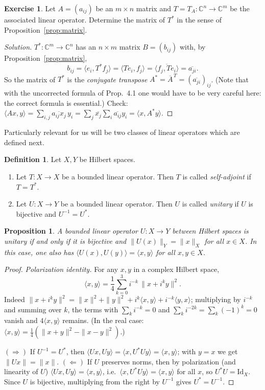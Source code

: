 \documentclass[11pt,a4paper]{article}
\numberwithin{equation}{section}
\newcommand{\C}{\mathbb{C}}
\newcommand{\ip}[2]{\langle #1, #2\rangle}
\newcommand{\conj}[1]{\overline{#1}}
\theoremstyle{plain}
\newtheorem{proposition}[theorem]{Proposition}
\theoremstyle{definition}
\newtheorem{definition}[theorem]{Definition}
\newtheorem{exercise}[theorem]{Exercise}
\theoremstyle{plain}
\theoremstyle{definition}
\newenvironment{solution}{\begin{proof}[Solution]}{\end{proof}}
\begin{document}
\begin{exercise}\label{exo:adjmatrix}
Let $A=(a_{ij})$ be an $m\times n$ matrix and $T=T_A:\C^n\to\C^m$ be the associated linear
operator. Determine the matrix of $T^*$ in the sense of Proposition~\ref{prop:matrix}.
\end{exercise}
\begin{solution}
$T^*:\C^m\to\C^n$ has an $n\times m$ matrix $B=(b_{ij})$ with, by Proposition~\ref{prop:matrix},
\[
b_{ij}=\ip{e_i}{T^*f_j}=\ip{Te_i}{f_j}=\conj{\ip{f_j}{Te_i}}=\conj{a_{ji}} .
\]
So the matrix of $T^*$ is the \emph{conjugate transpose} $A^*=\conj{A}^{\,T}=(\conj{a_{ji}})_{ij}$.
(Note that with the uncorrected formula of Prop.~4.1 one would have to be very careful
here: the correct formula is essential.) Check: $\ip{Ax}{y}=\sum_{i,j}\conj{a_{ij}x_j}\,y_i
=\sum_j\conj{x_j}\sum_i\conj{a_{ij}}y_i=\ip{x}{A^*y}$.
\end{solution}

Particularly relevant for us will be two classes of linear operators which are defined next.

\begin{definition}
Let $X,Y$ be Hilbert spaces.
\begin{enumerate}
\item Let $T:X\to X$ be a bounded linear operator. Then $T$ is called \emph{self-adjoint} if $T=T^*$.
\item Let $U:X\to Y$ be a bounded linear operator. Then $U$ is called \emph{unitary} if $U$
is bijective and $U^{-1}=U^*$.
\end{enumerate}
\end{definition}

\begin{proposition}\label{prop:unitary}
A bounded linear operator $U:X\to Y$ between Hilbert spaces is unitary if and only if it is
bijective and $\|U(x)\|_Y=\|x\|_X$ for all $x\in X$. In this case, one also has
$\ip{U(x)}{U(y)}=\ip{x}{y}$ for all $x,y\in X$.
\end{proposition}
\begin{proof}
\emph{Polarization identity.} For any $x,y$ in a complex Hilbert space,
\[
\ip{x}{y}=\frac14\sum_{k=0}^3i^{-k}\,\|x+i^ky\|^2 .
\]
Indeed $\|x+i^ky\|^2=\|x\|^2+\|y\|^2+i^k\ip{x}{y}+i^{-k}\ip{y}{x}$; multiplying by $i^{-k}$
and summing over $k$, the terms with $\sum_ki^{-k}=0$ and $\sum_ki^{-2k}=\sum_k(-1)^k=0$
vanish and $4\ip{x}{y}$ remains. (In the real case:
$\ip{x}{y}=\frac14(\|x+y\|^2-\|x-y\|^2)$.)

$(\Rightarrow)$ If $U^{-1}=U^*$, then $\ip{Ux}{Uy}=\ip{x}{U^*Uy}=\ip{x}{y}$; with $y=x$
we get $\|Ux\|=\|x\|$. $(\Leftarrow)$ If $U$ preserves norms, then by polarization (and
linearity of $U$) $\ip{Ux}{Uy}=\ip{x}{y}$, i.e.\ $\ip{x}{U^*Uy}=\ip{x}{y}$ for all $x$, so
$U^*U=\mathrm{Id}_X$. Since $U$ is bijective, multiplying from the right by $U^{-1}$ gives
$U^*=U^{-1}$.
\end{proof}
\end{document}
